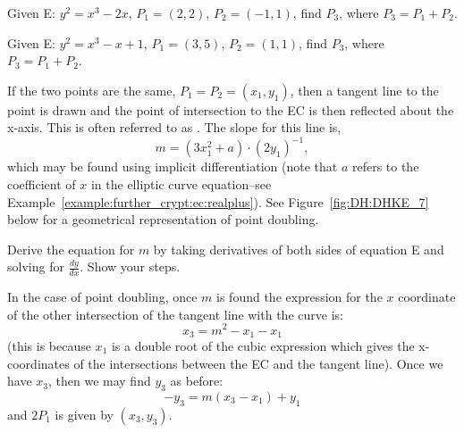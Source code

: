 \begin{exercise}{} Given E: $y^2 = x^3 - 2x$, $P_1 = (2, 2)$, $P_2 = (-1, 1)$, find $P_3$, where $P_3 = P_1 + P_2$.
\end{exercise}

\begin{exercise}{} Given E: $y^2 = x^3 - x + 1$, $P_1 = (3, 5)$, $P_2 = (1, 1)$, find $P_3$, where $P_3 = P_1 + P_2$.
\end{exercise}

If the two points are the same, $P_1 = P_2 = (x_1,y_1)$, then a tangent line to the point is drawn and the point of intersection to the EC is then reflected about the x-axis.  This is often referred to as . The slope for this line is, 
\[m = (3x_1^2 + a) \cdot (2y_1)^{-1},\] 
which may be found using implicit differentiation (note that $a$ refers to the coefficient of $x$ in the elliptic curve equation--see Example~\ref{example:further_crypt:ec:realplus}).  See Figure~\ref{fig:DH:DHKE_7} below for a geometrical representation of point doubling.

\begin{exercise}{}
Derive the equation for $m$ by taking derivatives of both sides  of equation  E and solving for $\frac{dy}{dx}$. Show your steps.
\end{exercise}

In the case of point doubling, once $m$ is found the expression for  the $x$ coordinate of the other intersection of the tangent line with the curve is:
\[ x_3 = m^2 - x_1 - x_1\]
(this is because $x_1$ is a double root of the cubic expression which gives the x-coordinates of the intersections between the EC and the tangent line). Once we have $x_3$, then we may find $y_3$ as before:
\[ -y_3 = m(x_3-x_1) + y_1 \]
and $2P_1$ is given by $(x_3,y_3)$.

